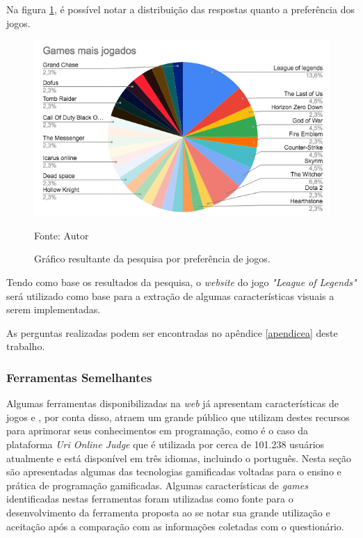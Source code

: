 Na figura \ref{gamejogados}, é possível notar a distribuição das respostas quanto a preferência dos jogos.

\pagebreak

\begin{figure}[h]
	\centering
	\includegraphics[keepaspectratio=true,scale=0.75]{figuras/gamejogados.png}
	\caption{Gráfico resultante da pesquisa por preferência de jogos.}
	Fonte: {Autor}
	\label{gamejogados}
\end{figure}

Tendo como base os resultados da pesquisa, o \textit{website} do jogo \textit{"League of Legends"} será utilizado como base para a extração de algumas
características visuais a serem implementadas.

As perguntas realizadas podem ser encontradas no apêndice \ref{apendicea} deste trabalho.

\subsubsection{Ferramentas Semelhantes}
Algumas ferramentas disponibilizadas na \textit{web} já apresentam características de jogos e , por conta disso,
atraem um grande público que utilizam destes recursos para aprimorar seus conhecimentos em programação, como é
o caso da plataforma \textit{Uri Online Judge} que é utilizada por cerca de 101.238 usuários atualmente e está disponível em três
idiomas, incluindo o português.
Nesta seção são apresentadas algumas das tecnologias gamificadas voltadas para o ensino e prática de programação
gamificadas. Algumas características de \textit{games} identificadas nestas ferramentas foram utilizadas como fonte
para o desenvolvimento da ferramenta proposta ao se notar sua grande utilização e aceitação após a comparação com as 
informações coletadas com o questionário.

